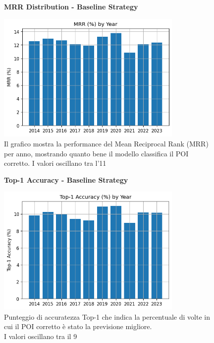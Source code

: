 \begin{enumerate}
\begin{figure}[H]
\centering
\textbf{MRR Distribution - Baseline Strategy}\par
\vspace{0.5em}
\includegraphics[width=0.8\textwidth]{../../img/no_SPACE-GEO_n-1_come_current_POI/mrr_distribution.png}
\caption{Il grafico mostra la performance del Mean Reciprocal Rank (MRR) per anno, mostrando quanto bene il modello classifica il POI corretto. I valori oscillano tra l'11%
}
\label{fig:baseline_mrr}
\end{figure}

\begin{figure}[H]
\centering
\textbf{Top-1 Accuracy - Baseline Strategy}\par
\vspace{0.5em}
\includegraphics[width=0.8\textwidth]{../../img/no_SPACE-GEO_n-1_come_current_POI/top1_accuracy.png}
\caption{Punteggio di accuratezza Top-1 che indica la percentuale di volte in cui il POI corretto è stato la previsione migliore.\\ I valori oscillano tra il 9%
}
\label{fig:baseline_top1}
\end{figure}


\end{enumerate}
